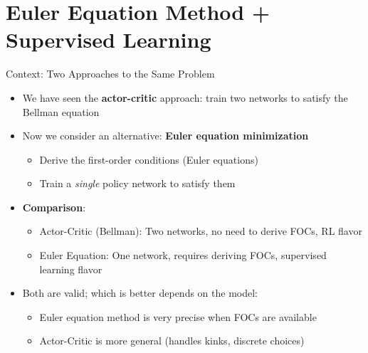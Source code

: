 \documentclass[10pt,english,aspectratio=169]{beamer}
\begin{document}
\section{Euler Equation Method + Supervised Learning}

\begin{frame}{Context: Two Approaches to the Same Problem}
\begin{itemize}
  \item We have seen the \textbf{actor-critic} approach: train two networks to satisfy the Bellman equation
  \medskip
  \item Now we consider an alternative: \textbf{Euler equation minimization}
    \begin{itemize}
      \item Derive the first-order conditions (Euler equations)
      \item Train a \emph{single} policy network to satisfy them
    \end{itemize}
  \medskip
  \item \textbf{Comparison}:
    \begin{itemize}
      \item Actor-Critic (Bellman): Two networks, no need to derive FOCs, RL flavor
      \item Euler Equation: One network, requires deriving FOCs, supervised learning flavor
    \end{itemize}
  \medskip
  \item Both are valid; which is better depends on the model:
    \begin{itemize}
      \item Euler equation method is very precise when FOCs are available
      \item Actor-Critic is more general (handles kinks, discrete choices)
    \end{itemize}
\end{itemize}
\end{frame}
\end{document}

